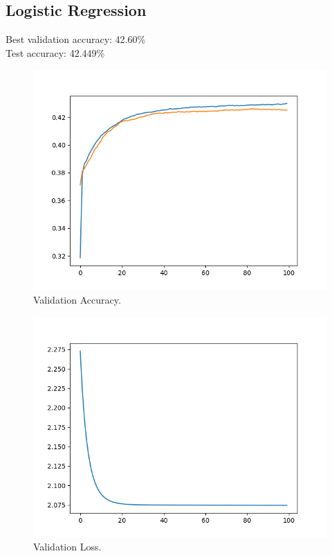 \documentclass[12pt, letter]{article}
\begin{document}
\pagebreak

\subsection{Logistic Regression}
Best validation accuracy: 42.60\% \\
Test accuracy: 42.449\% \\
\begin{figure}[h]
  \centering
  \includegraphics[scale=0.60]{hog_logreg_accuracy}
  \caption{Validation Accuracy.}
  \label{fig:eg}
\end{figure}
\begin{figure}[h]
  \centering
  \includegraphics[scale=0.60]{hog_logreg_loss}
  \caption{Validation Loss.}
  \label{fig:eg}
\end{figure}
\end{document}
